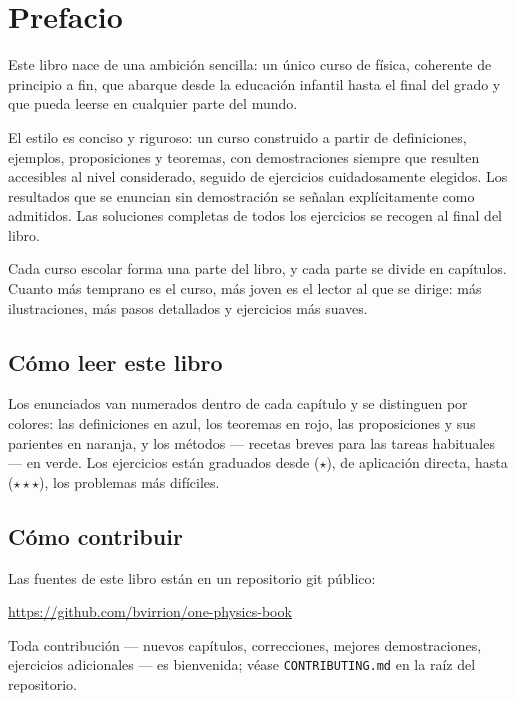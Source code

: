\chapter{Prefacio}

Este libro nace de una ambición sencilla: un único curso de física,
coherente de principio a fin, que abarque desde la educación infantil
hasta el final del grado y que pueda leerse en cualquier parte del
mundo.

El estilo es conciso y riguroso: un curso construido a partir de
definiciones, ejemplos, proposiciones y teoremas, con demostraciones
siempre que resulten accesibles al nivel considerado, seguido de
ejercicios cuidadosamente elegidos. Los resultados que se enuncian sin
demostración se señalan explícitamente como admitidos. Las soluciones
completas de todos los ejercicios se recogen al final del libro.

Cada curso escolar forma una parte del libro, y cada parte se divide en
capítulos. Cuanto más temprano es el curso, más joven es el lector al que
se dirige: más ilustraciones, más pasos detallados y ejercicios más
suaves.

\section*{Cómo leer este libro}

Los enunciados van numerados dentro de cada capítulo y se distinguen por
colores: las definiciones en azul, los teoremas en rojo, las
proposiciones y sus parientes en naranja, y los métodos --- recetas
breves para las tareas habituales --- en verde. Los ejercicios están
graduados desde ($\star$), de aplicación directa, hasta
($\star\star\star$), los problemas más difíciles.

\section*{Cómo contribuir}

Las fuentes de este libro están en un repositorio git público:
\begin{center}
\url{https://github.com/bvirrion/one-physics-book}
\end{center}
Toda contribución --- nuevos capítulos, correcciones, mejores
demostraciones, ejercicios adicionales --- es bienvenida; véase
\texttt{CONTRIBUTING.md} en la raíz del repositorio.
